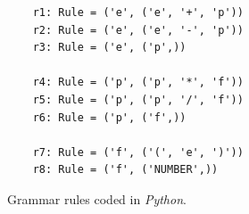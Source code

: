 \begin{table}[!ht]
  \centering
{}
  \caption{The function $\textsl{goto}()$.}
  \label{tab:goto}
\end{table}


\begin{figure}[!ht]
\centering
\begin{verbatim}
    r1: Rule = ('e', ('e', '+', 'p'))
    r2: Rule = ('e', ('e', '-', 'p'))
    r3: Rule = ('e', ('p',))

    r4: Rule = ('p', ('p', '*', 'f'))
    r5: Rule = ('p', ('p', '/', 'f'))
    r6: Rule = ('p', ('f',))

    r7: Rule = ('f', ('(', 'e', ')'))
    r8: Rule = ('f', ('NUMBER',))
\end{verbatim}
\vspace*{-0.3cm}
\caption{Grammar rules coded in \textsl{Python}.}
\label{fig:03-Parse-Table.ipynb:grammar}
\end{figure}


